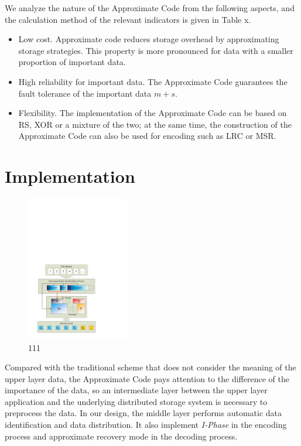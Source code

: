 \documentclass[sigconf]{acmart}
\begin{document}
We analyze the nature of the Approximate Code from the following aspects, and the calculation method of the relevant indicators is given in Table x.
\begin{itemize}
    \item Low cost. Approximate code reduces storage overhead by approximating storage strategies. This property is more pronounced for data with a smaller proportion of important data.
    \item High reliability for important data. The Approximate Code guarantees the fault tolerance of the important data $m+s$.
    \item Flexibility. The implementation of the Approximate Code can be based on RS, XOR or a mixture of the two; at the same time, the construction of the Approximate Code can also be used for encoding such as LRC or MSR.
\end{itemize}


\section{Implementation}

\begin{figure}[htb]
\centering
\includegraphics[width=0.4\textwidth]{photo/implementation.pdf}
\caption{111}
\label{fig-implementation}
\end{figure}

Compared with the traditional scheme that does not consider the meaning of the upper layer data, the Approximate Code pays attention to the difference of the importance of the data, so an intermediate layer between the upper layer application and the underlying distributed storage system is necessary to preprocess the data. In our design, the middle layer performs automatic data identification and data distribution. It also implement \emph{I-Phase} in the encoding process and approximate recovery mode in the decoding process.
\end{document}

